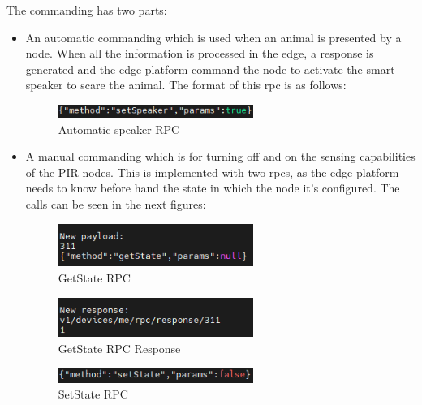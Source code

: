 The commanding has two parts:
\begin{itemize}
    \item An automatic commanding which is used when an animal is presented by a node. When all the information is processed in the edge, a response is 
    generated and the edge platform command the node to activate the smart speaker to scare the animal. The format of this \acrshort{rpc} is as follows:
    \begin{figure}[H]
        \centering
        \includegraphics[width=0.6\textwidth]{./images/8/speaker.png}
        \caption{Automatic speaker RPC}
        \label{fig:speakerRPC}
    \end{figure}
    \item A manual commanding which is for turning off and on the sensing capabilities of the PIR nodes. This is implemented with two \acrshort{rpc}s, as the edge 
    platform needs to know before hand the state in which the node it's configured. The calls can be seen in the next figures:

    \begin{figure}[H]
        \centering
        \includegraphics[width=0.6\textwidth]{./images/8/getStateRPC.png}
        \caption{GetState RPC}
        \label{fig:getStateRPC}
    \end{figure}

    \begin{figure}[H]
        \centering
        \includegraphics[width=0.6\textwidth]{./images/8/getStateRPCResponse.png}
        \caption{GetState RPC Response}
        \label{fig:getStateRPCResponse}
    \end{figure}

    \begin{figure}[H]
        \centering
        \includegraphics[width=0.6\textwidth]{./images/8/setState.png}
        \caption{SetState RPC}
        \label{fig:setStateRPC}
    \end{figure}

\end{itemize}


